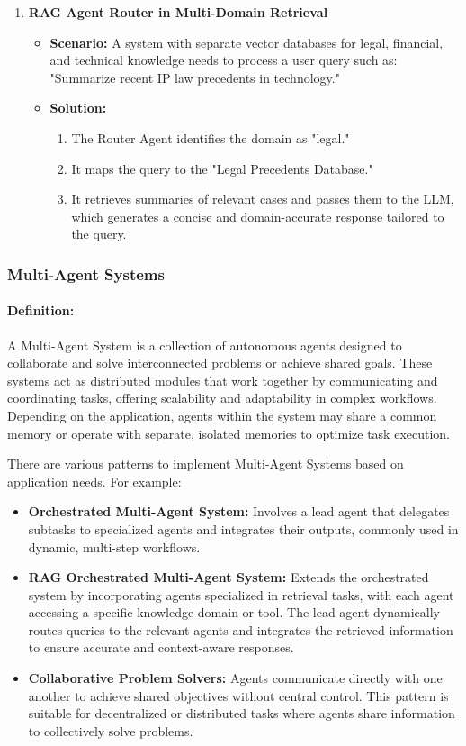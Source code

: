 \documentclass[12pt]{article}
\begin{document}
\begin{enumerate}
    \item \textbf{RAG Agent Router in Multi-Domain Retrieval}
    \begin{itemize}
        \item \textbf{Scenario:} A system with separate vector databases for legal, financial, and technical knowledge needs to process a user query such as: "Summarize recent IP law precedents in technology."
        \item \textbf{Solution:}
        \begin{enumerate}
            \item The Router Agent identifies the domain as "legal."
            \item It maps the query to the "Legal Precedents Database."
            \item It retrieves summaries of relevant cases and passes them to the LLM, which generates a concise and domain-accurate response tailored to the query.
        \end{enumerate}
    \end{itemize}
\end{enumerate}

\newpage
\subsubsection{Multi-Agent Systems}
\paragraph{Definition:}
A Multi-Agent System is a collection of autonomous agents designed to collaborate and solve interconnected problems or achieve shared goals. These systems act as distributed modules that work together by communicating and coordinating tasks, offering scalability and adaptability in complex workflows. Depending on the application, agents within the system may share a common memory or operate with separate, isolated memories to optimize task execution.

There are various patterns to implement Multi-Agent Systems based on application needs. For example:
\begin{itemize}
    \item \textbf{Orchestrated Multi-Agent System:} Involves a lead agent that delegates subtasks to specialized agents and integrates their outputs, commonly used in dynamic, multi-step workflows.
    \item \textbf{RAG Orchestrated Multi-Agent System:} Extends the orchestrated system by incorporating agents specialized in retrieval tasks, with each agent accessing a specific knowledge domain or tool. The lead agent dynamically routes queries to the relevant agents and integrates the retrieved information to ensure accurate and context-aware responses.
    \item \textbf{Collaborative Problem Solvers:} Agents communicate directly with one another to achieve shared objectives without central control. This pattern is suitable for decentralized or distributed tasks where agents share information to collectively solve problems.
\end{itemize}
\end{document}
